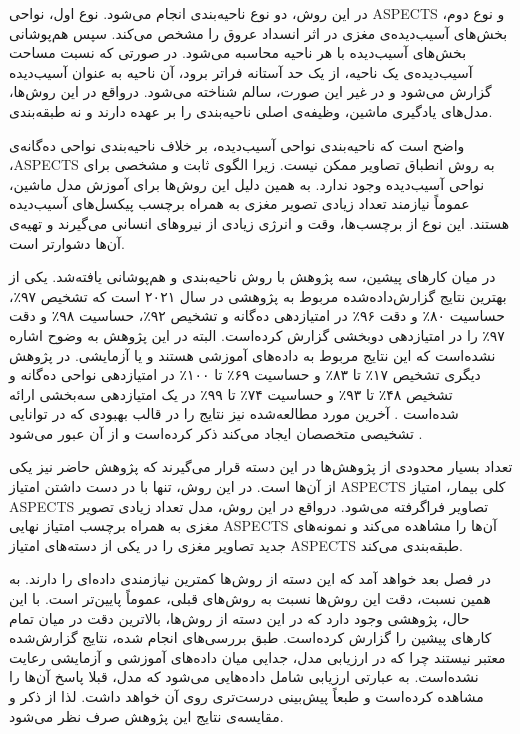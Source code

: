 در این روش، دو نوع ناحیه‌بندی انجام می‌شود.
نوع اول، نواحی ASPECTS و نوع دوم،
بخش‌های آسیب‌دیده‌ی مغزی در اثر انسداد عروق 
را مشخص می‌کند.
سپس هم‌پوشانی بخش‌های آسیب‌دیده با هر ناحیه محاسبه می‌شود.
در صورتی که نسبت مساحت آسیب‌دیده‌ی یک ناحیه، از یک حد آستانه فراتر برود، آن ناحیه به عنوان آسیب‌دیده گزارش می‌شود و در غیر این صورت، سالم شناخته می‌شود.
درواقع در این روش‌ها، مدل‌های یادگیری ماشین، وظیفه‌ی اصلی ناحیه‌بندی را بر عهده دارند و نه طبقه‌بندی.

واضح است که ناحیه‌بندی نواحی آسیب‌دیده، بر خلاف ناحیه‌بندی نواحی ده‌گانه‌ی ،ASPECTS
به روش انطباق تصاویر ممکن نیست.
زیرا الگوی ثابت و مشخصی برای نواحی آسیب‌دیده وجود ندارد.
به همین دلیل این روش‌ها برای آموزش مدل ماشین، عموماً نیازمند تعداد زیادی تصویر مغزی به همراه برچسب پیکسل‌های آسیب‌دیده هستند.
این نوع از برچسب‌ها، وقت و انرژی زیادی از نیرو‌های انسانی می‌گیرند و تهیه‌ی آن‌ها دشوارتر است.


در میان کارهای پیشین،
سه پژوهش با
روش ناحیه‌بندی و هم‌پوشانی
یافته‌شد.
یکی از بهترین نتایج 
گزارش‌داده‌شده مربوط به پژوهشی در سال ۲۰۲۱ است
\cite{naganuma2021alberta}
که
تشخیص
۹۷٪،
حساسیت
۸۰٪
و دقت 
۹۶٪
در امتیازدهی ده‌گانه و 
تشخیص
۹۲٪،
حساسیت
۹۸٪
و دقت 
۹۷٪
را
در امتیازدهی دوبخشی 
گزارش کرده‌است.
البته در این پژوهش به وضوح اشاره نشده‌است که این نتایج مربوط به داده‌های آموزشی هستند و یا آزمایشی.
در پژوهش دیگری
تشخیص
۱۷٪
تا
۸۳٪
و
حساسیت
۶۹٪
تا
۱۰۰٪
در امتیازدهی نواحی ده‌گانه و 
تشخیص
۴۸٪
تا
۹۳٪
و
حساسیت
۷۴٪
تا
۹۹٪
در یک امتیازدهی سه‌بخشی 
ارائه شده‌است \cite{yu2021automated}.
آخرین مورد مطالعه‌شده نیز نتایج را در قالب 
بهبودی که در توانایی تشخیصی متخصصان ایجاد می‌کند ذکر کرده‌است و از آن عبور می‌شود \cite{chen2022improving}.

تعداد بسیار محدودی از پژوهش‌ها در این دسته قرار می‌گیرند
که پژوهش حاضر نیز یکی از آن‌ها است.
در این روش، تنها با در دست داشتن امتیاز ASPECTS کلی بیمار، امتیاز ASPECTS تصاویر فراگرفته می‌شود.
درواقع در این روش، مدل تعداد زیادی تصویر مغزی به همراه برچسب امتیاز نهایی ASPECTS آن‌ها را مشاهده می‌کند و 
نمونه‌های جدید تصاویر مغزی را در یکی از دسته‌های امتیاز
ASPECTS
طبقه‌بندی می‌کند.

در فصل بعد خواهد آمد که این دسته از روش‌ها کمترین نیاز‌مندی داده‌ای را دارند.
به همین نسبت، دقت این روش‌ها نسبت به روش‌های قبلی، عموماً پایین‌تر است.
با این حال، پژوهشی
\cite{golkonda2022automated}
وجود دارد که در این دسته از روش‌ها، بالاترین دقت 
در میان تمام کارهای پیشین
را گزارش کرده‌است.
طبق بررسی‌های انجام شده، نتایج گزارش‌شده معتبر نیستند
چرا که در ارزیابی مدل، جدایی میان داده‌های آموزشی و آزمایشی رعایت نشده‌است.
به عبارتی ارزیابی شامل داده‌هایی می‌شود که مدل، قبلا پاسخ آن‌ها را مشاهده کرده‌است و طبعاً پیش‌بینی درست‌تری روی آن خواهد داشت.
لذا از ذکر و مقایسه‌ی نتایج این پژوهش صرف نظر می‌شود.

